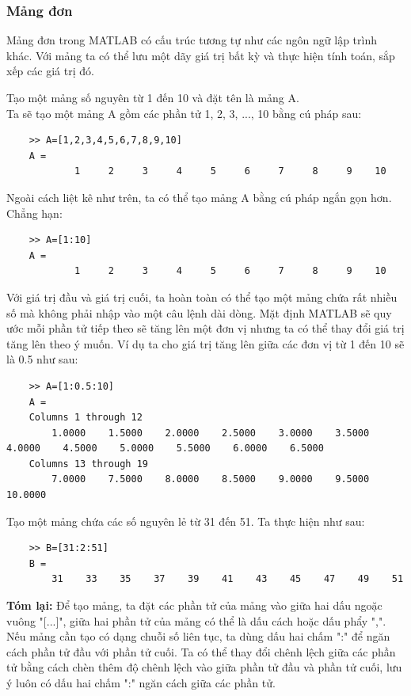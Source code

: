\documentclass[12pt,a4paper]{article}
\begin{document}
\subsubsection{Mảng đơn}
Mảng đơn trong MATLAB có cấu trúc tương tự như các ngôn ngữ lập trình khác. Với mảng ta có thể lưu một dãy giá trị bất kỳ và thực hiện tính toán, sắp xếp các giá trị đó.
\begin{example}
Tạo một mảng số nguyên từ 1 đến 10 và đặt tên là mảng A.\\
Ta sẽ tạo một mảng A gồm các phần tử 1, 2, 3, ..., 10 bằng cú pháp sau:
\begin{lstlisting}
	>> A=[1,2,3,4,5,6,7,8,9,10]
	A =
     		1     2     3     4     5     6     7     8     9    10
\end{lstlisting}	
Ngoài cách liệt kê như trên, ta có thể tạo mảng A bằng cú pháp ngắn gọn hơn. Chẳng hạn:
\begin{lstlisting}
	>> A=[1:10]
	A =
     		1     2     3     4     5     6     7     8     9    10
\end{lstlisting}
Với giá trị đầu và giá trị cuối, ta hoàn toàn có thể tạo một mảng chứa rất nhiều số mà không phải nhập vào một câu lệnh dài dòng. Mặt định MATLAB sẽ quy ước mỗi phần tử tiếp theo sẽ tăng lên một đơn vị nhưng ta có thể thay đổi giá trị tăng lên theo ý muốn. Ví dụ ta cho giá trị tăng lên giữa các đơn vị từ 1 đến 10 sẽ là 0.5 như sau:
\begin{lstlisting}
	>> A=[1:0.5:10]
	A =
  	Columns 1 through 12
    	1.0000    1.5000    2.0000    2.5000    3.0000    3.5000    4.0000    4.5000    5.0000    5.5000    6.0000    6.5000
  	Columns 13 through 19
    	7.0000    7.5000    8.0000    8.5000    9.0000    9.5000   10.0000
\end{lstlisting}
\end{example}
\begin{example}
Tạo một mảng chứa các số nguyên lẻ từ 31 đến 51. Ta thực hiện như sau:
\begin{lstlisting}
	>> B=[31:2:51]
	B =
    	31    33    35    37    39    41    43    45    47    49    51
\end{lstlisting}
\textbf{Tóm lại:} Để tạo mảng, ta đặt các phần tử của mảng vào giữa hai dấu ngoặc vuông "[...]", giữa hai phần tử của mảng có thể là dấu cách hoặc dấu phẩy ",". Nếu mảng cần tạo có dạng chuỗi số liên tục, ta dùng dấu hai chấm ":" để ngăn cách phần tử đầu với phần tử cuối. Ta có thể thay đổi chênh lệch giữa các phần tử bằng cách chèn thêm độ chênh lệch vào giữa phần tử đầu và phần tử cuối, lưu ý luôn có dấu hai chấm ":" ngăn cách giữa các phần tử.
\end{example}
\end{document}
